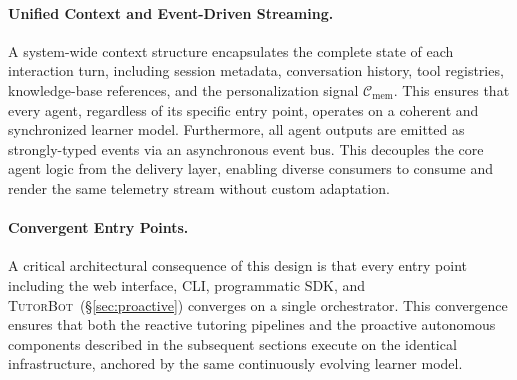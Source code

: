 \paragraph{Unified Context and Event-Driven Streaming. }A system-wide context structure encapsulates the complete state of each interaction turn, including session metadata, conversation history, tool registries, knowledge-base references, and the personalization signal $\mathcal{C}_{\text{mem}}$. This ensures that every agent, regardless of its specific entry point, operates on a coherent and synchronized learner model. Furthermore, all agent outputs are emitted as strongly-typed events via an asynchronous event bus. This decouples the core agent logic from the delivery layer, enabling diverse consumers to consume and render the same telemetry stream without custom adaptation.
\paragraph{Convergent Entry Points. }A critical architectural consequence of this design is that every entry point including the web interface, CLI, programmatic SDK, and \textsc{TutorBot}~(\S\ref{sec:proactive}) converges on a single orchestrator. This convergence ensures that both the reactive tutoring pipelines and the proactive autonomous components described in the subsequent sections execute on the identical infrastructure, anchored by the same continuously evolving learner model.






